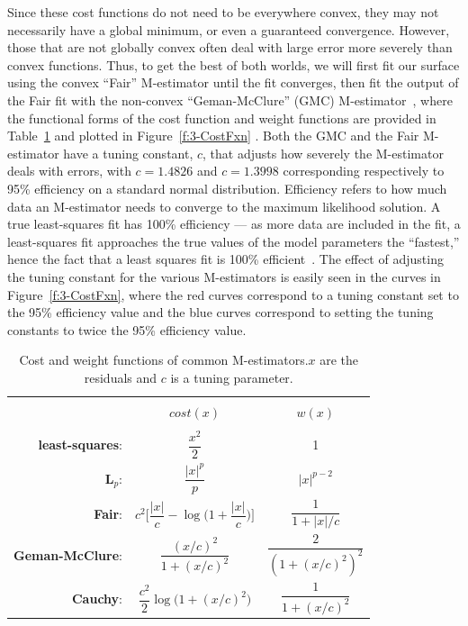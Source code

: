 Since these cost functions do not need to be everywhere convex, they may not necessarily have a global minimum, or even a guaranteed convergence.
However, those that are not globally convex often deal with large error more severely than convex functions.
Thus, to get the best of both worlds, we will first fit our surface using the convex ``Fair'' M-estimator until the fit converges, then fit the output of the Fair fit with the non-convex ``Geman-McClure'' (GMC) M-estimator~\cite{RN52}, where the functional forms of the cost function and weight functions are provided in Table~\ref{t:3-CostFxn} and plotted in Figure~\ref{f:3-CostFxn} .
Both the GMC and the Fair M-estimator have a tuning constant, $c$, that adjusts how severely the M-estimator deals with errors, with $c = 1.4826$ and $c = 1.3998$ corresponding respectively to 95\% efficiency on a standard normal distribution.
Efficiency refers to how much data an M-estimator needs to converge to the maximum likelihood solution.
A true least-squares fit has 100\% efficiency --- as more data are included in the fit, a least-squares fit approaches the true values of the model parameters the ``fastest,'' hence the fact that a least squares fit is 100\% efficient~\cite{RN269}.
The effect of adjusting the tuning constant for the various M-estimators is easily seen in the curves in Figure~\ref{f:3-CostFxn}, where the red curves correspond to a tuning constant set to the 95\% efficiency value and the blue curves correspond to setting the tuning constants to twice the 95\% efficiency value.
\newpage
\begin{table}[ht]
  \centering
  \caption{Cost and weight functions of common M-estimators.\@ $x$ are the residuals and $c$ is a tuning parameter.}
  \begin{tabular}{|r c c |}
    \hline \\[-0.45cm]
     & $\mathit{cost}(x)$ & $w(x)$\\
    \hline \\[-0.3cm]
    {\bf least-squares}:& $\dfrac{x^2}{2}$ & 1\\ [0.5cm]
    {\bf L$_p$}:& $ \dfrac{|x|^p}{p} $ & $|x|^{p-2}$\\[0.5cm]
    {\bf Fair}:& $c^2 \Bigg [ \dfrac{|x|}{c} - \log \Big ( 1 + \dfrac{|x|}{c}\Big ) \Bigg ]$ & $\dfrac{1}{1 + |x|/c}$ \\ [0.5cm]
    {\bf Geman-McClure}:& $\dfrac{(x/c)^2}{1+(x/c)^2}$ & $\dfrac{2}{(1+(x/c)^2)^2}$ \\ [0.5cm]
    {\bf Cauchy}:& $\dfrac{c^2}{2} \log \big ( 1 + (x/c)^2 \big)$ & $\dfrac{1}{1 + (x/c)^2}$\\ [0.5cm]
    \hline
  \end{tabular}\label{t:3-CostFxn}
\end{table}

